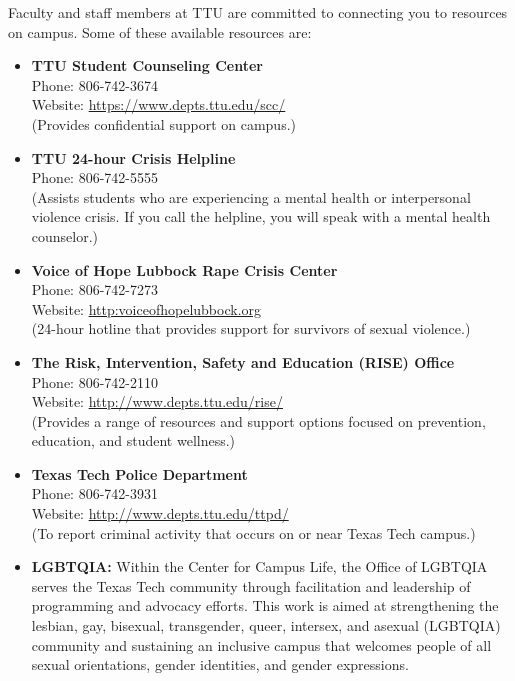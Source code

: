 \documentclass[11pt]{NSF}
\def\bi{\begin{itemize}}
\def\ei{\end{itemize}}
\def\i{\item{}}
\begin{document}
Faculty and staff
members at TTU are committed to connecting you to resources on campus.
Some of these available resources are: 

\bi
\i {\bf TTU Student Counseling Center}\\
Phone: 806-742-3674\\
Website: \url{https://www.depts.ttu.edu/scc/}\\
(Provides confidential support on campus.) 

\i {\bf TTU 24-hour Crisis Helpline}\\
Phone: 806-742-5555\\
(Assists students who are experiencing a mental health or
interpersonal violence crisis. If you call the helpline, you will
speak with a mental health counselor.) 

\i {\bf Voice of Hope Lubbock Rape Crisis Center}\\
Phone: 806-742-7273\\
Website: \url{http:voiceofhopelubbock.org}\\
(24-hour hotline
that provides support for survivors of sexual violence.) 

\i {\bf The Risk, Intervention, Safety and Education (RISE) Office}\\
Phone: 806-742-2110\\
Website: \url{http://www.depts.ttu.edu/rise/}\\
(Provides a range of resources and support options
focused on prevention, education, and student wellness.) 

\i {\bf Texas Tech Police Department}\\
Phone: 806-742-3931\\ 
Website: \url{http://www.depts.ttu.edu/ttpd/}\\ 
(To report criminal activity that occurs on or near Texas Tech campus.)

\i {\bf LGBTQIA:}
Within the Center for Campus Life, the Office of LGBTQIA
serves the Texas Tech community through facilitation and leadership of
programming and advocacy efforts. This work is aimed at strengthening
the lesbian, gay, bisexual, transgender, queer, intersex, and asexual
(LGBTQIA) community and sustaining an inclusive campus that welcomes
people of all sexual orientations, gender identities, and gender
expressions.

\ei
\end{document}

